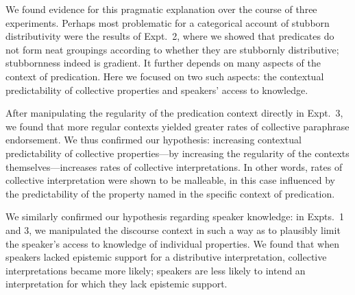 \documentclass[preprint,12pt,authoryear,titlepage]{elsarticle}
\newcommand{\ndg}[1]{\textcolor{Green}{[ndg: #1]}}
\begin{document}


We found evidence for this pragmatic explanation over the course of three experiments. Perhaps most problematic for a categorical account of stubborn distributivity were the results of Expt.~2, where we showed that predicates do not form neat groupings according to whether they are stubbornly distributive; stubbornness indeed is gradient. It further depends on many aspects of the context of predication. Here we focused on two such aspects: the contextual predictability of collective properties and speakers' access to knowledge.

After manipulating the regularity of the predication context directly in Expt.~3, we found that more regular contexts yielded greater rates of collective paraphrase endorsement. We thus confirmed our hypothesis: increasing contextual predictability of collective properties---by increasing the regularity of the contexts themselves---increases rates of collective interpretations. In other words, rates of collective interpretation were shown to be malleable, in this case influenced by the predictability of the property named in the specific context of predication. 

We similarly confirmed our hypothesis regarding speaker knowledge: in Expts.~1 and 3, we manipulated the discourse context in such a way as to plausibly limit the speaker's access to knowledge of individual properties. We found that when speakers lacked epistemic support for a distributive interpretation, collective interpretations became more likely; speakers are less likely to intend an interpretation for which they lack epistemic support.
\end{document}
